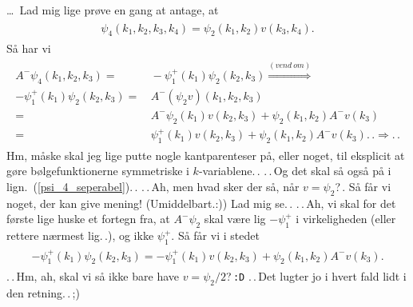 \documentclass{report}
\begin{document}
\ldots\ Lad mig lige prøve en gang at antage, at 
\begin{align}
\begin{aligned}
	\psi_4(k_1, k_2, k_3, k_4) = \psi_2(k_1, k_2) v(k_3, k_4).
	\label{psi_4_seperabel}
\end{aligned}
\end{align}
Så har vi
\begin{align}
\begin{aligned}
	A^- \psi_4(k_1, k_2, k_3) =&\, -\psi_1^+(k_1)\psi_2(k_2, k_3) \stackrel{(vend\ om)}{\Longrightarrow}\\
	-\psi_1^+(k_1)\psi_2(k_2, k_3)  =&\, 
		A^- (\psi_2 v)(k_1, k_2, k_3) \\%
	=&\, A^- \psi_2(k_1) v(k_2, k_3) + \psi_2(k_1, k_2) A^- v(k_3) \\
	=&\, \psi_1^+(k_1) v(k_2, k_3) + \psi_2(k_1, k_2) A^- v(k_3).\,. \Longrightarrow .\,.
\end{aligned}
\end{align}
Hm, måske skal jeg lige putte nogle kantparenteser på, eller noget, til eksplicit at gøre bølgefunktionerne symmetriske i $k$-variablene.\,. .\,.\,Og det skal så også på i lign.\ (\ref{psi_4_seperabel}).\,. .\,.\,Ah, men hvad sker der så, når $v = \psi_2$?\,. Så får vi noget, der kan give mening! (Umiddelbart.:)) Lad mig se.\,. .\,.\,Ah, vi skal for det første lige huske et fortegn fra, at $A^- \psi_2$ skal være lig $-\psi_1^+$ i virkeligheden (eller rettere nærmest lig.\,.), og ikke $\psi_1^+$. Så får vi i stedet
\begin{align}
\begin{aligned}
	-\psi_1^+(k_1)\psi_2(k_2, k_3) =
		-\psi_1^+(k_1) v(k_2, k_3) + \psi_2(k_1, k_2) A^- v(k_3).
\end{aligned}
\end{align}
.\,.\,Hm, ah, skal vi så ikke bare have $v = \psi_2 / 2$?\,\texttt{:D} .\,.\,Det lugter jo i hvert fald lidt i den retning.\,.\,;) 
\end{document}
